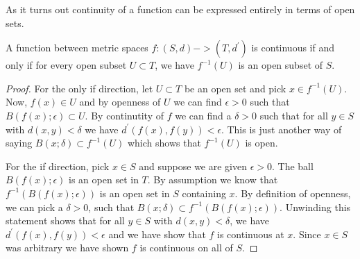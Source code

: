 As it turns out continuity of a function can be expressed entirely in
terms of open sets.
\begin{lem}\label{ContinuousPreImageOfOpenSet}A function between metric spaces $f : (S,d) -> (T,d^\prime)$ is continuous
  if and only if for every open subset $U \subset T$, we have $f^{-1}(U)$ is an
  open subset of $S$.
\end{lem}
\begin{proof}For the only if direction, let $U \subset T$ be an open set and pick $x \in
  f^{-1}(U)$.  Now, $f(x) \in U$ and by openness of $U$ we can find $\epsilon
  > 0$ such that $B(f(x); \epsilon) \subset U$.  By continutity of $f$
  we can find a $\delta > 0$ such that for all $y \in S$ with $d(x,y) <
  \delta$ we  have $d^\prime(f(x),f(y)) < \epsilon$.  This is just
  another way of saying $B(x; \delta) \subset f^{-1}(U)$ which shows
  that $f^{-1}(U)$ is open.

For the if direction, pick $x \in S$ and suppose we are given
$\epsilon > 0$.  The ball $B(f(x); \epsilon)$ is an open set in $T$.  
By assumption we know that $f^{-1}(B(f(x); \epsilon))$ is
an open set in $S$ containing $x$.   By definition of openness, we can pick a $\delta > 0$, such that 
$B(x;\delta) \subset f^{-1}(B(f(x); \epsilon))$.  Unwinding this
statement shows that for all $y \in S$ with $d(x,y) < \delta$, we have
$d^\prime(f(x),f(y)) < \epsilon$ and we have show that $f$ is
continuous at $x$.  Since $x \in S$ was arbitrary we have shown $f$ is
continuous on all of $S$.
\end{proof}

